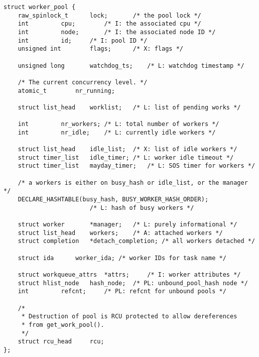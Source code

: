 
\begin{lstlisting}
struct worker_pool {
	raw_spinlock_t		lock;		/* the pool lock */
	int			cpu;		/* I: the associated cpu */
	int			node;		/* I: the associated node ID */
	int			id;		/* I: pool ID */
	unsigned int		flags;		/* X: flags */

	unsigned long		watchdog_ts;	/* L: watchdog timestamp */

	/* The current concurrency level. */
	atomic_t		nr_running;

	struct list_head	worklist;	/* L: list of pending works */

	int			nr_workers;	/* L: total number of workers */
	int			nr_idle;	/* L: currently idle workers */

	struct list_head	idle_list;	/* X: list of idle workers */
	struct timer_list	idle_timer;	/* L: worker idle timeout */
	struct timer_list	mayday_timer;	/* L: SOS timer for workers */

	/* a workers is either on busy_hash or idle_list, or the manager */
	DECLARE_HASHTABLE(busy_hash, BUSY_WORKER_HASH_ORDER);
						/* L: hash of busy workers */

	struct worker		*manager;	/* L: purely informational */
	struct list_head	workers;	/* A: attached workers */
	struct completion	*detach_completion; /* all workers detached */

	struct ida		worker_ida;	/* worker IDs for task name */

	struct workqueue_attrs	*attrs;		/* I: worker attributes */
	struct hlist_node	hash_node;	/* PL: unbound_pool_hash node */
	int			refcnt;		/* PL: refcnt for unbound pools */

	/*
	 * Destruction of pool is RCU protected to allow dereferences
	 * from get_work_pool().
	 */
	struct rcu_head		rcu;
};
\end{lstlisting}
